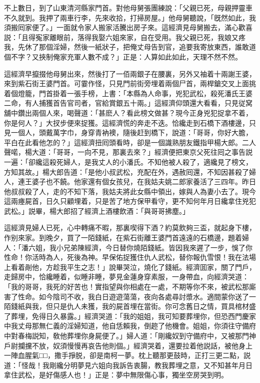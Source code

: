 不上數日，到了山東清河縣家門首。對他母舅張團練說：「父親已死，母親押靈車不久就到。我押了兩車行李，先來收拾，打掃房屋。」他母舅聽說，「旣然如此，我須搬囘家便了。」一面就令家人搬家活騰出房子來。這經濟見母舅搬去，滿心歡喜説：「且得寃家離眼前，落得我娶六姐來家，自在受用。我父親已死，我娘又疼我，先休了那個淫婦，然後一紙狀子，把俺丈母告到官，追要我寄放東西，誰敢道個不字？又挾制俺家充軍人數不成？」正是：人算如此如此，天理不然不然。

這經濟早攛掇他母舅出來，然後打了一佰兩銀子在腰裏，另外又袖着十兩謝王婆，來到紫石街王婆門首。可霎作怪，只見門前街旁埋着兩個尸首，兩桿鎗交叉上面挑着個燈籠，門首掛着一張手榜，上書：「本縣為人命事，兇犯武松，殺死潘氏王婆二命，有人捕獲首告官司者，官給賞銀五十兩。」這經濟仰頭還大看看，只見従窝舖中鑽出兩個人來，喝聲道：「甚麽人？看此榜文做甚？現今正身兇犯捉拿不着，你是何人？」大扠步便來捉獲。這經濟慌的奔走不迭。恰纔走到石橋下酒樓邊，只見一個人，頭戴萬字巾，身穿青衲襖，隨後赶到橋下，說道：「哥哥，你好大膽，平白在此看他怎的？」這經濟扭囘頭看時，卻是一個識熟朋友鐵指甲楊大郎。二人聲喏，楊大道：「哥哥，一向不見，那裏去來？」經濟便把東京父死往囘之事告説一遍：「卻纔這殺死婦人，是我丈人的小潘氏。不知他被人殺了，適纔見了榜文，方知其故。」楊大郎告道：「是他小叔武松，充配在外，遇赦囘還，不知因甚殺了婦人，連王婆子也不饒。他家還有個女孩兒，在我姑夫姚二郎家養活了三四年。昨日他叔叔殺了人，走的不知下落，我姑夫將此女縣中領出，嫁與人為妻小去了。現今這兩瘞屍首，日久只顧埋着，只是苦了地方保甲看守，更不知何年月日纔拿住兇犯武松。」説畢，楊大郎招了經濟上酒樓飲酒：「與哥哥拂塵。」

這經濟見婦人已死，心中轉痛不暇，那裏喫得下酒？約莫飲夠三盃，就起身下樓，作别來家。到晚夕，買了一陌錢紙，在紫石街離王婆門首遠遠的石橋邊，題着婦人：「潘六姐，我小兄弟陳經濟，今日替你燒陌錢紙。皆因我來遲了一步，悞了你性命！你活時為人，死後為神。早保佑捉獲住仇人武松，替你報仇雪恨！我在法場上看着剮他，方趁我平生之志！」說畢哭泣，燒化了錢紙。經濟囬家，關了門戶，走歸房中，恰纔睡着，似睡非睡，夢見金蓮身穿素服，一身帶血，向經濟哭道：「我的哥哥，我死的好苦也！實指望與你相處在一處，不期等你不來，被武松那廝害了性命。如今陰司不收，我白日遊遊蕩蕩，夜向各處尋討漿水。適間蒙你送了一陌錢紙與我，但只是仇人未獲，我的屍首埋在當街。你可念舊日之情，買具棺材盛了葬埋，免得日久暴露。」經濟哭道：「我的姐姐，我可知要葬埋你，但恐西門慶家中我丈母那無仁義的淫婦知道，他自恁賴我，倒趂了他機會。姐姐，你須往守備府中對春梅説知，敎他葬埋你身屍便了。」婦人道：「剛纔奴到守備府中，又被那門神戶尉攔攩不放，奴須慢慢再哀告他則個。」經濟哭着，還要拉着他説話，被他身上一陣血腥氣□□，撒手掙脱，卻是南柯一夢。枕上聽那更鼓時，正打三更二點，説道：「怪哉！我剛纔分明夢見六姐向我訴告衷腸，教我葬埋之意，又不知甚年月日拿住武松，是好傷感人也！」正是：夢中無限傷心事，獨坐空房哭到明。

